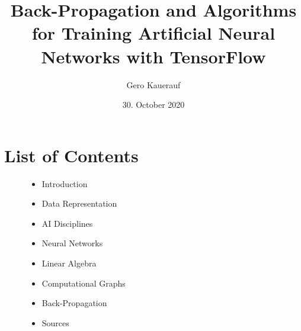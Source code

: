 \documentclass[handout]{beamer}
\begin{document}

\title{Back-Propagation and Algorithms for Training Artificial Neural Networks with TensorFlow}
\date{30. October 2020}
\author{Gero Kauerauf}

\frame{\titlepage}

\section{List of Contents}
\begin{frame}
    \begin{figure}
        \centering
        \begin{itemize}[<+->]
            \item Introduction
            \item Data Representation
            \item AI Disciplines
            \item Neural Networks
            \item Linear Algebra
            \item Computational Graphs
            \item Back-Propagation
            \item Sources
        \end{itemize}
    \end{figure}
\end{frame}
\end{document}
